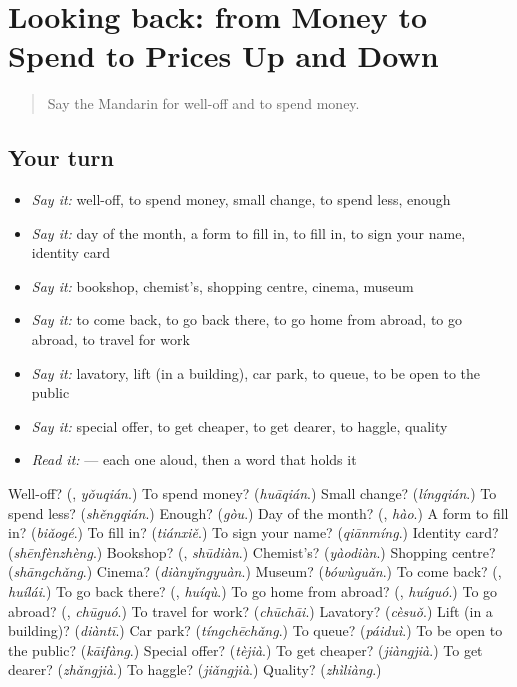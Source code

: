 \section[(dialogue)]{Looking back: from Money to Spend to Prices Up and Down}

\label{lesson:ZH-R193-review-188-193}



\begin{quote}
Say the Mandarin for well-off and to spend money.
\end{quote}

\subsection*{Your turn}
\begin{itemize}
\raggedright
  \item \emph{Say it:} well-off, to spend money, small change, to spend less, enough
  \item \emph{Say it:} day of the month, a form to fill in, to fill in, to sign your name, identity card
  \item \emph{Say it:} bookshop, chemist's, shopping centre, cinema, museum
  \item \emph{Say it:} to come back, to go back there, to go home from abroad, to go abroad, to travel for work
  \item \emph{Say it:} lavatory, lift (in a building), car park, to queue, to be open to the public
  \item \emph{Say it:} special offer, to get cheaper, to get dearer, to haggle, quality
  \item \emph{Read it:}     — each one aloud, then a word that holds it
\end{itemize}

\begin{tcolorbox}[breakable,colback=teal!4,colframe=teal!35!black,title={Before you move on}]
Well-off? (\textbf{}, \emph{yǒuqián}.) To spend money? (\emph{huāqián}.) Small change? (\emph{língqián}.) To spend less? (\emph{shěngqián}.) Enough? (\emph{gòu}.) Day of the month? (\textbf{}, \emph{hào}.) A form to fill in? (\emph{biǎogé}.) To fill in? (\emph{tiánxiě}.) To sign your name? (\emph{qiānmíng}.) Identity card? (\emph{shēnfènzhèng}.) Bookshop? (\textbf{}, \emph{shūdiàn}.) Chemist's? (\emph{yàodiàn}.) Shopping centre? (\emph{shāngchǎng}.) Cinema? (\emph{diànyǐngyuàn}.) Museum? (\emph{bówùguǎn}.) To come back? (\textbf{}, \emph{huílái}.) To go back there? (\textbf{}, \emph{huíqù}.) To go home from abroad? (\textbf{}, \emph{huíguó}.) To go abroad? (\textbf{}, \emph{chūguó}.) To travel for work? (\emph{chūchāi}.) Lavatory? (\emph{cèsuǒ}.) Lift (in a building)? (\emph{diàntī}.) Car park? (\emph{tíngchēchǎng}.) To queue? (\emph{páiduì}.) To be open to the public? (\emph{kāifàng}.) Special offer? (\emph{tèjià}.) To get cheaper? (\emph{jiàngjià}.) To get dearer? (\emph{zhǎngjià}.) To haggle? (\emph{jiǎngjià}.) Quality? (\emph{zhìliàng}.)
\end{tcolorbox}

